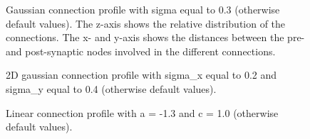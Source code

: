 \documentclass[landscape]{article}
\begin{document}

\begin{figure}[B]
\caption{Gaussian connection profile with sigma equal to 0.3 (otherwise default values). The z-axis shows the relative distribution of the connections. The x- and y-axis shows the distances between the pre- and post-synaptic nodes involved in the different connections.}
\end{figure}

\clearpage


\begin{figure}[B]
\caption{2D gaussian connection profile with sigma\_x equal to 0.2 and sigma\_y equal to 0.4 (otherwise default values).}
\end{figure}

\clearpage


\begin{figure}[B]
\caption{Linear connection profile with a = -1.3 and c = 1.0 (otherwise default values).}
\end{figure}
\end{document}
